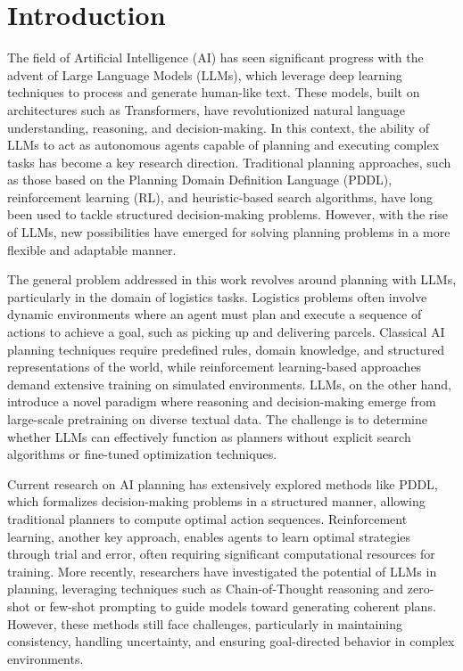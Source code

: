 \chapter{Introduction}
\label{cha:introduction}

The field of Artificial Intelligence (AI) has seen significant progress with the
advent of Large Language Models (LLMs), which leverage deep learning techniques to
process and generate human-like text. These models, built on architectures such as
Transformers, have revolutionized natural language understanding, reasoning, and
decision-making. In this context, the ability of LLMs to act as autonomous
agents capable of planning and executing complex tasks has become a key research
direction. Traditional planning approaches, such as those based on the Planning
Domain Definition Language (PDDL), reinforcement learning (RL), and heuristic-based
search algorithms, have long been used to tackle structured decision-making problems.
However, with the rise of LLMs, new possibilities have emerged for solving
planning problems in a more flexible and adaptable manner.

The general problem addressed in this work revolves around planning with LLMs, particularly
in the domain of logistics tasks. Logistics problems often involve dynamic
environments where an agent must plan and execute a sequence of actions to
achieve a goal, such as picking up and delivering parcels. Classical AI planning
techniques require predefined rules, domain knowledge, and structured
representations of the world, while reinforcement learning-based approaches demand
extensive training on simulated environments. LLMs, on the other hand, introduce
a novel paradigm where reasoning and decision-making emerge from large-scale
pretraining on diverse textual data. The challenge is to determine whether LLMs can
effectively function as planners without explicit search algorithms or fine-tuned
optimization techniques.

Current research on AI planning has extensively explored methods like PDDL,
which formalizes decision-making problems in a structured manner, allowing traditional
planners to compute optimal action sequences. Reinforcement learning, another key
approach, enables agents to learn optimal strategies through trial and error, often
requiring significant computational resources for training. More recently, researchers
have investigated the potential of LLMs in planning, leveraging techniques such
as Chain-of-Thought reasoning and zero-shot or few-shot prompting to guide
models toward generating coherent plans. However, these methods still face
challenges, particularly in maintaining consistency, handling uncertainty, and ensuring
goal-directed behavior in complex environments.

